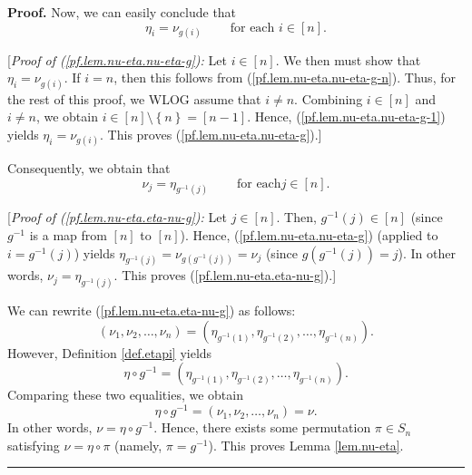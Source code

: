 \documentclass
[numbers=enddot,12pt,final,onecolumn,notitlepage,english]{scrartcl}%
\theoremstyle{definition}
\newenvironment{proof}[1][Proof]{\noindent\textbf{#1.} }{\ \rule{0.5em}{0.5em}}
\newenvironment{verlong}{}{}
\begin{document}
\begin{verlong}
\begin{proof}
Now, we can easily conclude that%
\begin{equation}
\eta_{i}=\nu_{g\left(  i\right)  }\ \ \ \ \ \ \ \ \ \ \text{for each }%
i\in\left[  n\right]  . \label{pf.lem.nu-eta.nu-eta-g}%
\end{equation}


[\textit{Proof of (\ref{pf.lem.nu-eta.nu-eta-g}):} Let $i\in\left[  n\right]
$. We then must show that $\eta_{i}=\nu_{g\left(  i\right)  }$. If $i=n$, then
this follows from (\ref{pf.lem.nu-eta.nu-eta-g-n}). Thus, for the rest of this
proof, we WLOG assume that $i\neq n$. Combining $i\in\left[  n\right]  $ and
$i\neq n$, we obtain $i\in\left[  n\right]  \setminus\left\{  n\right\}
=\left[  n-1\right]  $. Hence, (\ref{pf.lem.nu-eta.nu-eta-g-1}) yields
$\eta_{i}=\nu_{g\left(  i\right)  }$. This proves
(\ref{pf.lem.nu-eta.nu-eta-g}).] \medskip

Consequently, we obtain that%
\begin{equation}
\nu_{j}=\eta_{g^{-1}\left(  j\right)  }\ \ \ \ \ \ \ \ \ \ \text{for each
}j\in\left[  n\right]  . \label{pf.lem.nu-eta.eta-nu-g}%
\end{equation}


[\textit{Proof of (\ref{pf.lem.nu-eta.eta-nu-g}):} Let $j\in\left[  n\right]
$. Then, $g^{-1}\left(  j\right)  \in\left[  n\right]  $ (since $g^{-1}$ is a
map from $\left[  n\right]  $ to $\left[  n\right]  $). Hence,
(\ref{pf.lem.nu-eta.nu-eta-g}) (applied to $i=g^{-1}\left(  j\right)  $)
yields $\eta_{g^{-1}\left(  j\right)  }=\nu_{g\left(  g^{-1}\left(  j\right)
\right)  }=\nu_{j}$ (since $g\left(  g^{-1}\left(  j\right)  \right)  =j$). In
other words, $\nu_{j}=\eta_{g^{-1}\left(  j\right)  }$. This proves
(\ref{pf.lem.nu-eta.eta-nu-g}).] \medskip

We can rewrite (\ref{pf.lem.nu-eta.eta-nu-g}) as follows:%
\[
\left(  \nu_{1},\nu_{2},\ldots,\nu_{n}\right)  =\left(  \eta_{g^{-1}\left(
1\right)  },\eta_{g^{-1}\left(  2\right)  },\ldots,\eta_{g^{-1}\left(
n\right)  }\right)  .
\]
However, Definition \ref{def.etapi} yields%
\[
\eta\circ g^{-1}=\left(  \eta_{g^{-1}\left(  1\right)  },\eta_{g^{-1}\left(
2\right)  },\ldots,\eta_{g^{-1}\left(  n\right)  }\right)  .
\]
Comparing these two equalities, we obtain%
\[
\eta\circ g^{-1}=\left(  \nu_{1},\nu_{2},\ldots,\nu_{n}\right)  =\nu.
\]
In other words, $\nu=\eta\circ g^{-1}$. Hence, there exists some permutation
$\pi\in S_{n}$ satisfying $\nu=\eta\circ\pi$ (namely, $\pi=g^{-1}$). This
proves Lemma \ref{lem.nu-eta}.
\end{proof}
\end{verlong}
\end{document}
